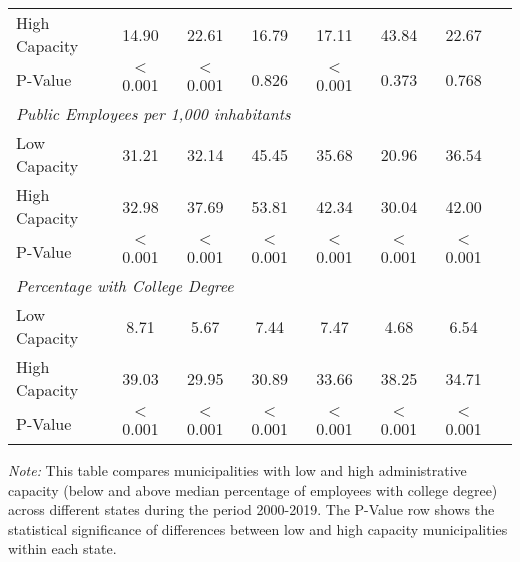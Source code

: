 \documentclass[12pt]{article}
\begin{document}
\begin{table}[htbp]
\begin{threeparttable}
\begin{adjustbox}{max width=\textwidth}
\begin{tabular}{lccccccc}
\quad High Capacity & 14.90 & 22.61 & 16.79 & 17.11 & 43.84 & 22.67 \\
\quad P-Value & $<$0.001 & $<$0.001 & 0.826 & $<$0.001 & 0.373 & 0.768 \\[4pt]
\multicolumn{8}{l}{\textit{Public Employees per 1,000 inhabitants}} \\
\quad Low Capacity & 31.21 & 32.14 & 45.45 & 35.68 & 20.96 & 36.54 & \\
\quad High Capacity & 32.98 & 37.69 & 53.81 & 42.34 & 30.04 & 42.00 \\
\quad P-Value & $<$0.001 & $<$0.001 & $<$0.001 & $<$0.001 & $<$0.001 & $<$0.001 \\[4pt]
\multicolumn{8}{l}{\textit{Percentage with College Degree}} \\
\quad Low Capacity & 8.71 & 5.67 & 7.44 & 7.47 & 4.68 & 6.54 & \\
\quad High Capacity & 39.03 & 29.95 & 30.89 & 33.66 & 38.25 & 34.71 \\
\quad P-Value & $<$0.001 & $<$0.001 & $<$0.001 & $<$0.001 & $<$0.001 & $<$0.001 \\
\bottomrule
\end{tabular}
\end{adjustbox}
\begin{tablenotes}
\small
\item \textit{Note:} This table compares municipalities with low and high administrative capacity (below and above median percentage of employees with college degree) across different states during the period 2000-2019. The P-Value row shows the statistical significance of differences between low and high capacity municipalities within each state.
\end{tablenotes}
\end{threeparttable}
\end{table}
\end{document}
